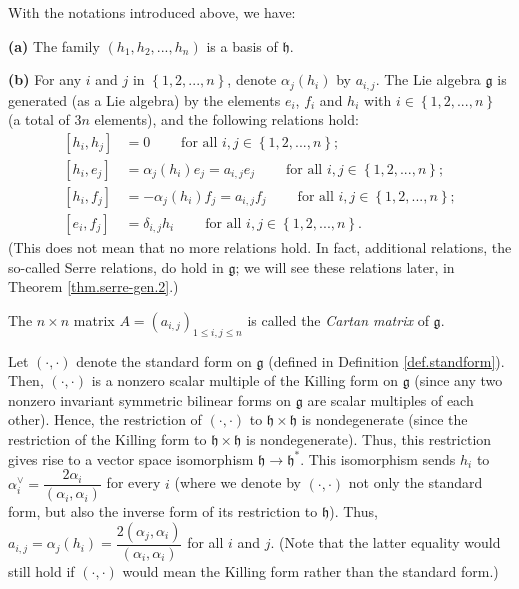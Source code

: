 \documentclass[etingof-lie.tex]{subfiles}
\begin{document}
\begin{proposition}
\label{prop.serre-gen.1}With the notations introduced above, we have:

\textbf{(a)} The family $\left(  h_{1},h_{2},...,h_{n}\right)  $ is a basis of
$\mathfrak{h}$.

\textbf{(b)} For any $i$ and $j$ in $\left\{  1,2,...,n\right\}  $, denote
$\alpha_{j}\left(  h_{i}\right)  $ by $a_{i,j}$. The Lie algebra
$\mathfrak{g}$ is generated (as a Lie algebra) by the elements $e_{i}$,
$f_{i}$ and $h_{i}$ with $i\in\left\{  1,2,...,n\right\}  $ (a total of $3n$
elements), and the following relations hold:%
\begin{align*}
\left[  h_{i},h_{j}\right]   &  =0\ \ \ \ \ \ \ \ \ \ \text{for all }%
i,j\in\left\{  1,2,...,n\right\}  ;\\
\left[  h_{i},e_{j}\right]   &  =\alpha_{j}\left(  h_{i}\right)  e_{j}%
=a_{i,j}e_{j}\ \ \ \ \ \ \ \ \ \ \text{for all }i,j\in\left\{
1,2,...,n\right\}  ;\\
\left[  h_{i},f_{j}\right]   &  =-\alpha_{j}\left(  h_{i}\right)
f_{j}=a_{i,j}f_{j}\ \ \ \ \ \ \ \ \ \ \text{for all }i,j\in\left\{
1,2,...,n\right\}  ;\\
\left[  e_{i},f_{j}\right]   &  =\delta_{i,j}h_{i}%
\ \ \ \ \ \ \ \ \ \ \text{for all }i,j\in\left\{  1,2,...,n\right\}  .
\end{align*}
(This does not mean that no more relations hold. In fact, additional
relations, the so-called Serre relations, do hold in $\mathfrak{g}$; we will
see these relations later, in Theorem \ref{thm.serre-gen.2}.)

The $n\times n$ matrix $A=\left(  a_{i,j}\right)  _{1\leq i,j\leq n}$ is
called the \textit{Cartan matrix} of $\mathfrak{g}$.

Let $\left(  \cdot,\cdot\right)  $ denote the standard form on $\mathfrak{g}$
(defined in Definition \ref{def.standform}). Then, $\left(  \cdot
,\cdot\right)  $ is a nonzero scalar multiple of the Killing form on
$\mathfrak{g}$ (since any two nonzero invariant symmetric bilinear forms on
$\mathfrak{g}$ are scalar multiples of each other). Hence, the restriction of
$\left(  \cdot,\cdot\right)  $ to $\mathfrak{h}\times\mathfrak{h}$ is
nondegenerate (since the restriction of the Killing form to $\mathfrak{h}%
\times\mathfrak{h}$ is nondegenerate). Thus, this restriction gives rise to a
vector space isomorphism $\mathfrak{h}\rightarrow\mathfrak{h}^{\ast}$. This
isomorphism sends $h_{i}$ to $\alpha_{i}^{\vee}=\dfrac{2\alpha_{i}}{\left(
\alpha_{i},\alpha_{i}\right)  }$ for every $i$ (where we denote by $\left(
\cdot,\cdot\right)  $ not only the standard form, but also the inverse form of
its restriction to $\mathfrak{h}$). Thus, $a_{i,j}=\alpha_{j}\left(
h_{i}\right)  =\dfrac{2\left(  \alpha_{j},\alpha_{i}\right)  }{\left(
\alpha_{i},\alpha_{i}\right)  }$ for all $i$ and $j$. (Note that the latter
equality would still hold if $\left(  \cdot,\cdot\right)  $ would mean the
Killing form rather than the standard form.)


\end{proposition}
\end{document}
